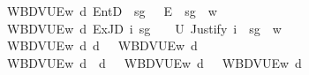 \begin{isabellebody}
\ \ {\isacharbar}{\kern0pt}\ {\isachardoublequoteopen}{\isasymlangle}W{\isacharcomma}{\kern0pt}B{\isacharcomma}{\kern0pt}D{\isacharcomma}{\kern0pt}V{\isacharcomma}{\kern0pt}U{\isacharcomma}{\kern0pt}E{\isasymrangle}{\isacharcomma}{\kern0pt}w\ {\isasymTurnstile}\isactrlsup d\ EntD\ {\isasymPhi}\ sg\ {\isasymphi}\ {\isacharequal}{\kern0pt}\ E\ {\isasymPhi}\ sg\ {\isasymphi}\ w{\isachardoublequoteclose}\isanewline
\ \ {\isacharbar}{\kern0pt}\ {\isachardoublequoteopen}{\isasymlangle}W{\isacharcomma}{\kern0pt}B{\isacharcomma}{\kern0pt}D{\isacharcomma}{\kern0pt}V{\isacharcomma}{\kern0pt}U{\isacharcomma}{\kern0pt}E{\isasymrangle}{\isacharcomma}{\kern0pt}w\ {\isasymTurnstile}\isactrlsup d\ ExJD\ i\ sg\ {\isasymphi}\ {\isacharequal}{\kern0pt}\ {\isacharparenleft}{\kern0pt}{\isasymexists}{\isasymDelta}{\isachardot}{\kern0pt}\ U\ {\isacharparenleft}{\kern0pt}Justify\ i\ {\isasymDelta}\ sg\ {\isasymphi}{\isacharparenright}{\kern0pt}\ w{\isacharparenright}{\kern0pt}{\isachardoublequoteclose}\isanewline
\ \ {\isacharbar}{\kern0pt}\ {\isachardoublequoteopen}{\isasymlangle}W{\isacharcomma}{\kern0pt}B{\isacharcomma}{\kern0pt}D{\isacharcomma}{\kern0pt}V{\isacharcomma}{\kern0pt}U{\isacharcomma}{\kern0pt}E{\isasymrangle}{\isacharcomma}{\kern0pt}w\ {\isasymTurnstile}\isactrlsup d\ {\isasymnot}\isactrlsup d{\isasymphi}\ {\isacharequal}{\kern0pt}\ {\isacharparenleft}{\kern0pt}{\isasymnot}\ {\isasymlangle}W{\isacharcomma}{\kern0pt}B{\isacharcomma}{\kern0pt}D{\isacharcomma}{\kern0pt}V{\isacharcomma}{\kern0pt}U{\isacharcomma}{\kern0pt}E{\isasymrangle}{\isacharcomma}{\kern0pt}w\ {\isasymTurnstile}\isactrlsup d\ {\isasymphi}{\isacharparenright}{\kern0pt}{\isachardoublequoteclose}\isanewline
\ \ {\isacharbar}{\kern0pt}\ {\isachardoublequoteopen}{\isasymlangle}W{\isacharcomma}{\kern0pt}B{\isacharcomma}{\kern0pt}D{\isacharcomma}{\kern0pt}V{\isacharcomma}{\kern0pt}U{\isacharcomma}{\kern0pt}E{\isasymrangle}{\isacharcomma}{\kern0pt}w\ {\isasymTurnstile}\isactrlsup d\ {\isasymphi}\ {\isasymsupset}\isactrlsup d\ {\isasympsi}\ {\isacharequal}{\kern0pt}\ {\isacharparenleft}{\kern0pt}{\isasymlangle}W{\isacharcomma}{\kern0pt}B{\isacharcomma}{\kern0pt}D{\isacharcomma}{\kern0pt}V{\isacharcomma}{\kern0pt}U{\isacharcomma}{\kern0pt}E{\isasymrangle}{\isacharcomma}{\kern0pt}w\ {\isasymTurnstile}\isactrlsup d\ {\isasymphi}\ {\isasymlongrightarrow}\ {\isasymlangle}W{\isacharcomma}{\kern0pt}B{\isacharcomma}{\kern0pt}D{\isacharcomma}{\kern0pt}V{\isacharcomma}{\kern0pt}U{\isacharcomma}{\kern0pt}E{\isasymrangle}{\isacharcomma}{\kern0pt}w\ {\isasymTurnstile}\isactrlsup d\ {\isasympsi}{\isacharparenright}{\kern0pt}{\isachardoublequoteclose}\isanewline

\end{isabellebody}
